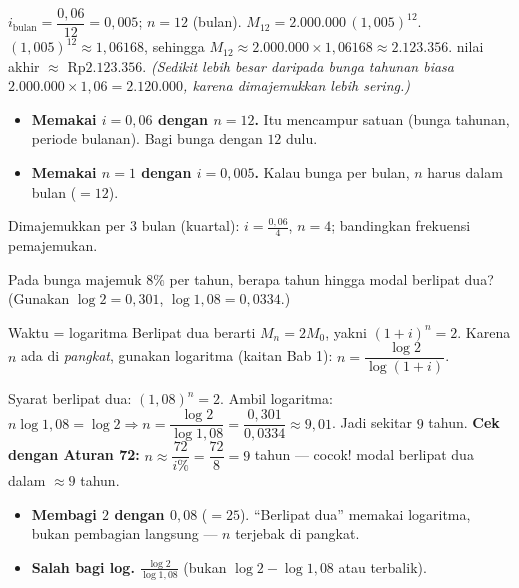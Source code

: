 \jawab
{} $i_\text{bulan}=\dfrac{0{,}06}{12}=0{,}005$; $n=12$ (bulan).
 $M_{12}=2.000.000\,(1{,}005)^{12}$.
 $(1{,}005)^{12}\approx1{,}06168$, sehingga
$M_{12}\approx2.000.000\times1{,}06168\approx2.123.356$.
\jadi nilai akhir $\approx$ Rp$2.123.356$.
\emph{(Sedikit lebih besar daripada bunga tahunan biasa $2.000.000\times1{,}06
=2.120.000$, karena dimajemukkan lebih sering.)}

\begin{jebakan}
\begin{itemize}[leftmargin=*,topsep=2pt]
  \item \textbf{Memakai $i=0{,}06$ dengan $n=12$.} Itu mencampur satuan (bunga
  tahunan, periode bulanan). Bagi bunga dengan $12$ dulu.
  \item \textbf{Memakai $n=1$ dengan $i=0{,}005$.} Kalau bunga per bulan, $n$
  harus dalam bulan ($=12$).
\end{itemize}
\end{jebakan}

\begin{variasi}
Dimajemukkan per $3$ bulan (kuartal): $i=\frac{0{,}06}{4}$, $n=4$; bandingkan
frekuensi pemajemukan.
\end{variasi}

\begin{soalbox}{}
Pada bunga majemuk $8\%$ per tahun, berapa tahun hingga modal berlipat dua?
(Gunakan $\log 2=0{,}301$, $\log 1{,}08=0{,}0334$.)
\end{soalbox}

\begin{ingat}{Waktu = logaritma}
Berlipat dua berarti $M_n=2M_0$, yakni $(1+i)^n=2$. Karena $n$ ada di
\emph{pangkat}, gunakan logaritma (kaitan Bab 1):
$n=\dfrac{\log 2}{\log(1+i)}$.
\end{ingat}

\jawab
{} Syarat berlipat dua: $(1{,}08)^n=2$.
 Ambil logaritma: $n\log1{,}08=\log2\Rightarrow
n=\dfrac{\log2}{\log1{,}08}=\dfrac{0{,}301}{0{,}0334}\approx9{,}01$.
 Jadi sekitar $9$ tahun.
 \textbf{Cek dengan Aturan 72:} $n\approx\dfrac{72}{i\%}=\dfrac{72}{8}
=9$ tahun --- cocok!
\jadi modal berlipat dua dalam $\approx9$ tahun.

\begin{jebakan}
\begin{itemize}[leftmargin=*,topsep=2pt]
  \item \textbf{Membagi $2$ dengan $0{,}08$} ($=25$). ``Berlipat dua'' memakai
  logaritma, bukan pembagian langsung --- $n$ terjebak di pangkat.
  \item \textbf{Salah bagi log.} $\frac{\log2}{\log1{,}08}$ (bukan $\log2-\log1{,}08$
  atau terbalik).
\end{itemize}
\end{jebakan}

